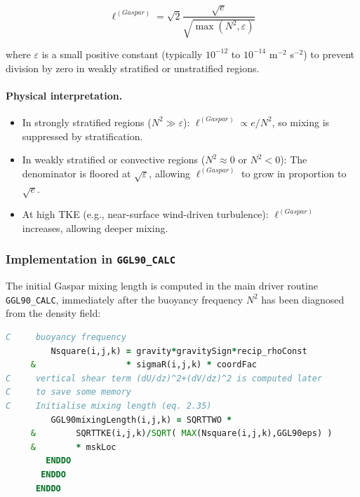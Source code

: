 \documentclass[12pt,letterpaper]{article}
\begin{document}
\begin{equation}
\ell^{(Gaspar)} = \sqrt{2} \frac{\sqrt{e}}{\sqrt{\max(N^2, \varepsilon)}}
\label{eq:mxl_gaspar}
\end{equation}

where $\varepsilon$ is a small positive constant (typically $10^{-12}$ to $10^{-14}$ m$^{-2}$ s$^{-2}$) to prevent division by zero in weakly stratified or unstratified regions.

\paragraph{Physical interpretation.}
\begin{itemize}
\item In strongly stratified regions ($N^2 \gg \varepsilon$): $\ell^{(Gaspar)} \propto e/N^2$, so mixing is suppressed by stratification.
\item In weakly stratified or convective regions ($N^2 \approx 0$ or $N^2 < 0$): The denominator is floored at $\sqrt{\varepsilon}$, allowing $\ell^{(Gaspar)}$ to grow in proportion to $\sqrt{e}$.
\item At high TKE (e.g., near-surface wind-driven turbulence): $\ell^{(Gaspar)}$ increases, allowing deeper mixing.
\end{itemize}

\subsubsection{Implementation in \texttt{GGL90\_CALC}}

The initial Gaspar mixing length is computed in the main driver routine \verb|GGL90_CALC|, immediately after the buoyancy frequency $N^2$ has been diagnosed from the density field:

\begin{lstlisting}[language=Fortran,caption={(ggl90\_calc.F:L346--357) Initial mixing length estimate}]
C     buoyancy frequency
         Nsquare(i,j,k) = gravity*gravitySign*recip_rhoConst
     &                  * sigmaR(i,j,k) * coordFac
C     vertical shear term (dU/dz)^2+(dV/dz)^2 is computed later
C     to save some memory
C     Initialise mixing length (eq. 2.35)
         GGL90mixingLength(i,j,k) = SQRTTWO *
     &        SQRTTKE(i,j,k)/SQRT( MAX(Nsquare(i,j,k),GGL90eps) )
     &        * mskLoc
        ENDDO
       ENDDO
      ENDDO
\end{lstlisting}
\end{document}
